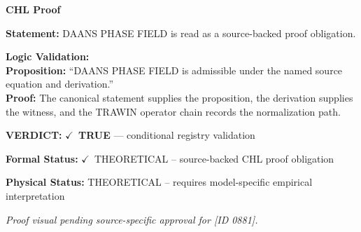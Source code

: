 \vspace{0.45em}
\noindent\textbf{CHL Proof}\par
\textbf{Statement:} DAANS PHASE FIELD is read as a source-backed proof obligation.

\textbf{Logic Validation:}\\
\textbf{Proposition:} ``DAANS PHASE FIELD is admissible under the named source equation and derivation.''\\
\textbf{Proof:} The canonical statement supplies the proposition, the derivation supplies the witness, and the TRAWIN operator chain records the normalization path.

\textbf{VERDICT:} \ensuremath{\checkmark}\ \textbf{TRUE} --- conditional registry validation

\textbf{Formal Status:} \ensuremath{\checkmark}\ THEORETICAL -- source-backed CHL proof obligation

\textbf{Physical Status:} THEORETICAL -- requires model-specific empirical interpretation
\par\vspace{0.45em}
\par
\vfill
\begingroup\footnotesize\itshape
Proof visual pending source-specific approval for [ID 0881].
\par\endgroup
\vfill
\endgroup
\endgroup
